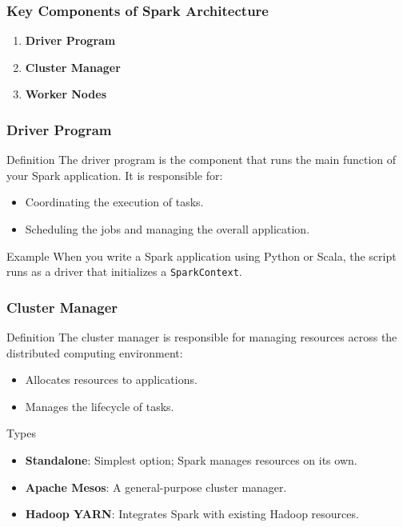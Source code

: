 \documentclass[aspectratio=169]{beamer}
\begin{document}
\begin{frame}[fragile]
    \frametitle{Key Components of Spark Architecture}
    \begin{enumerate}
        \item \textbf{Driver Program}
        \item \textbf{Cluster Manager}
        \item \textbf{Worker Nodes}
    \end{enumerate}
\end{frame}

\begin{frame}[fragile]
    \frametitle{Driver Program}
    \begin{block}{Definition}
        The driver program is the component that runs the main function of your Spark application. It is responsible for:
    \end{block}
    \begin{itemize}
        \item Coordinating the execution of tasks.
        \item Scheduling the jobs and managing the overall application.
    \end{itemize}
    \begin{block}{Example}
        When you write a Spark application using Python or Scala, the script runs as a driver that initializes a \texttt{SparkContext}.
    \end{block}
\end{frame}

\begin{frame}[fragile]
    \frametitle{Cluster Manager}
    \begin{block}{Definition}
        The cluster manager is responsible for managing resources across the distributed computing environment:
    \end{block}
    \begin{itemize}
        \item Allocates resources to applications.
        \item Manages the lifecycle of tasks.
    \end{itemize}
    \begin{block}{Types}
        \begin{itemize}
            \item \textbf{Standalone}: Simplest option; Spark manages resources on its own.
            \item \textbf{Apache Mesos}: A general-purpose cluster manager.
            \item \textbf{Hadoop YARN}: Integrates Spark with existing Hadoop resources.
        \end{itemize}
    \end{block}
\end{frame}
\end{document}
